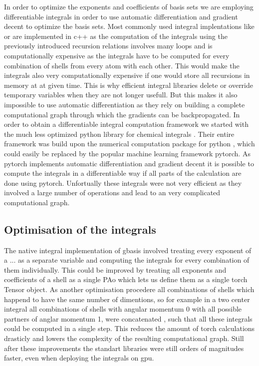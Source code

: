 In order to optimize the exponents and coefficients of basis sets we are employing differentiable integrals in order to use automatic differentiation and gradient decent to optimize the basis sets. Most commonly used integral implentations like \cite{libxc} or \cite{orca} are implemented in c++ as the computation of the integrals using the previously introduced recursion relations involves many loops and is computationally expensive as the integrals have to be computed for every combination of shells from every atom with each other. This would make the integrals also very computationally expensive if one would store all recursions in memory at at given time. This is why efficient integral libraries delete or override temporary variables when they are not longer usefull. But this makes it also impossible to use automatic differentiation as they rely on building a complete computational graph through which the gradients can be backpropagated. In order to obtain a differentiable integral computation framework we started with the much less optimized python library for chemical integrals \cite{gbasis}. Their entire framework was build upon the numerical computation package for python \cite{numpy}, which could easily be replaced by the popular machine learning framework pytorch\cite{pytorch}. As pytorch implements automatic differentiation and gradient decent it is possible to compute the integrals in a differentiable way if all parts of the calculation are done using pytorch. Unfortually these integrals were not very efficient as they involved a large number of operations and lead to an very complicated computational graph.

\subsection{Optimisation of the integrals}
The native integral implementation of gbasis involved treating every exponent of a ... as a separate variable and computing the integrals for every combination of them individually. This could be improved by treating all exponents and coefficients of a shell as a single PAo which lets us define them as a single torch Tensor object. As another optimisation procedere all combinations of shells which happend to have the same number of dimentions, so for example in a two center integral all combinations of shells with angular momentum 0 with all possible partners of anglar momentum 1, were concatenated , such that all these integrals could be computed in a single step. This reduces the amount of torch calculations drasticly and lowers the complexity of the resulting computational graph.
Still after these improvements the standart libraries were still orders of magnitudes faster, even when deploying the integrals on gpu.
